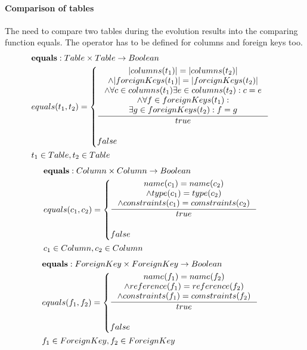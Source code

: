\documentclass[11pt]{article}
\begin{document}
\paragraph{Comparison of tables} The need to compare two tables during the evolution results into the comparing function equals. The operator has to be defined for columns and foreign keys too.
\begin{align*}
& \mathbf{equals} : Table \times Table \rightarrow Boolean \\
&	equals(t_1, t_2) = \begin{cases}
 		\inference{|columns(t_1)| = |columns(t_2)| \\ \wedge |foreignKeys(t_1)| = |foreignKeys(t_2)| \\ \wedge \forall c \in columns(t_1) \exists e \in columns(t_2) : c = e \\ \wedge \forall f \in foreignKeys(t_1) : \\ \exists g \in foreignKeys(t_2) : f = g }{true}\\\\
 false
 \end{cases}\\
& t_1 \in Table, t_2 \in Table
\end{align*}
\begin{align*}
& \mathbf{equals} : Column \times Column \rightarrow Boolean \\
&	equals(c_1, c_2) = \begin{cases}
 		\inference{name(c_1) = name(c_2) \\ \wedge type(c_1) = type(c_2) \\ \wedge constraints(c_1) = comstraints(c_2)}{true}
 		\\ \\
		false
 \end{cases}\\
& c_1 \in Column, c_2 \in Column
\end{align*}
\begin{align*}
&	\mathbf{equals} : ForeignKey \times ForeignKey \rightarrow Boolean \\
&	equals(f_1, f_2) = \begin{cases}
 		\inference{name(f_1) = name(f_2) \\ \wedge reference(f_1) = reference(f_2) \\ \wedge constraints(f_1) = comstraints(f_2)}{true}
 		\\ \\
		false
 \end{cases}\\
& f_1 \in ForeignKey, f_2 \in ForeignKey
\end{align*}
\end{document}
